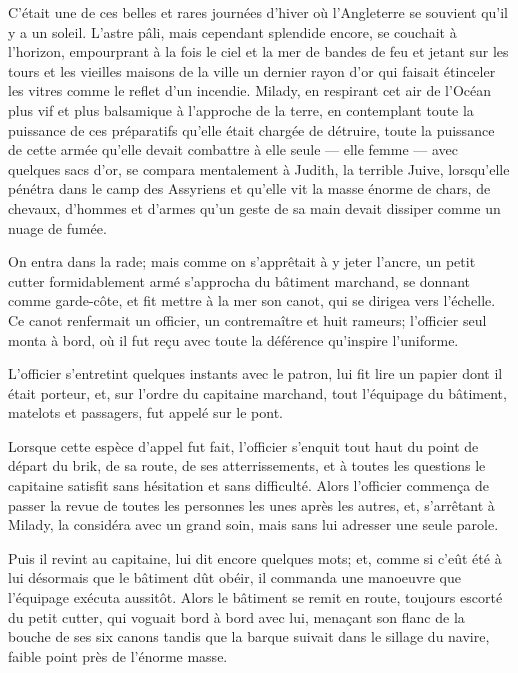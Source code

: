 C'était une de ces belles et rares journées d'hiver où l'Angleterre se souvient qu'il y a un soleil. L'astre pâli, mais cependant splendide encore, se couchait à l'horizon, empourprant à la fois le ciel et la mer de bandes de feu et jetant sur les tours et les vieilles maisons de la ville un dernier rayon d'or qui faisait étinceler les vitres comme le reflet d'un incendie. Milady, en respirant cet air de l'Océan plus vif et plus balsamique à l'approche de la terre, en contemplant toute la puissance de ces préparatifs qu'elle était chargée de détruire, toute la puissance de cette armée qu'elle devait combattre à elle seule --- elle femme --- avec quelques sacs d'or, se compara mentalement à Judith, la terrible Juive, lorsqu'elle pénétra dans le camp des Assyriens et qu'elle vit la masse énorme de chars, de chevaux, d'hommes et d'armes qu'un geste de sa main devait dissiper comme un nuage de fumée. 

On entra dans la rade; mais comme on s'apprêtait à y jeter l'ancre, un petit cutter formidablement armé s'approcha du bâtiment marchand, se donnant comme garde-côte, et fit mettre à la mer son canot, qui se dirigea vers l'échelle. Ce canot renfermait un officier, un contremaître et huit rameurs; l'officier seul monta à bord, où il fut reçu avec toute la déférence qu'inspire l'uniforme. 

L'officier s'entretint quelques instants avec le patron, lui fit lire un papier dont il était porteur, et, sur l'ordre du capitaine marchand, tout l'équipage du bâtiment, matelots et passagers, fut appelé sur le pont. 

Lorsque cette espèce d'appel fut fait, l'officier s'enquit tout haut du point de départ du brik, de sa route, de ses atterrissements, et à toutes les questions le capitaine satisfit sans hésitation et sans difficulté. Alors l'officier commença de passer la revue de toutes les personnes les unes après les autres, et, s'arrêtant à Milady, la considéra avec un grand soin, mais sans lui adresser une seule parole. 

Puis il revint au capitaine, lui dit encore quelques mots; et, comme si c'eût été à lui désormais que le bâtiment dût obéir, il commanda une manoeuvre que l'équipage exécuta aussitôt. Alors le bâtiment se remit en route, toujours escorté du petit cutter, qui voguait bord à bord avec lui, menaçant son flanc de la bouche de ses six canons tandis que la barque suivait dans le sillage du navire, faible point près de l'énorme masse. 

